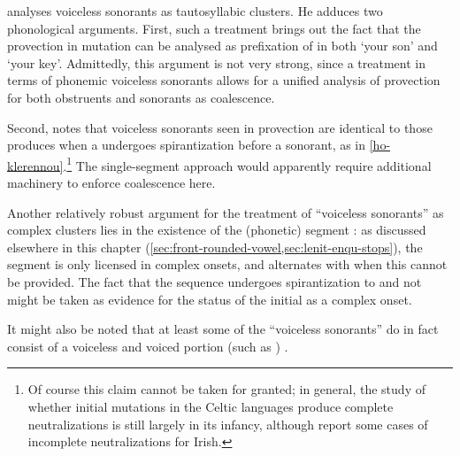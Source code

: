 \citet{humphreys,humphreys95:_phonol_bothoa_saint_nicol_pelem} analyses voiceless sonorants as tautosyllabic clusters. He adduces two phonological arguments. First, such a treatment brings out the fact that the provection in mutation can be analysed as prefixation of \ipa{[h]} in both  `your son' and \ipa{[o ˈhalve]} `your key'. Admittedly, this argument  is not very strong, since a treatment in terms of phonemic voiceless sonorants allows for a unified analysis of provection for both obstruents and sonorants as coalescence.

Second, \citet{humphreys95:_phonol_bothoa_saint_nicol_pelem} notes that voiceless sonorants seen in provection are identical to those produces when a \ipa{[k]} undergoes spirantization before a sonorant, as in \ref{ho-klerennou}.\footnote{Of course this claim cannot be taken for granted; in general, the study of whether initial mutations in the Celtic languages produce complete neutralizations is still largely in its infancy, although \citet{welby10:_irish} report some cases of incomplete neutralizations for Irish.} The single\hyp segment approach would apparently require additional machinery to enforce coalescence here.

Another relatively robust argument for the treatment of \enquote{voiceless sonorants} as complex clusters lies in the existence of the (phonetic) segment : as discussed elsewhere in this chapter (\cref{sec:front-rounded-vowel,sec:lenit-enqu-stops}), the segment \ipa{[ɥ]} is only licensed in complex onsets, and alternates with \ipa{[v]} when this cannot be provided. The fact that the sequence \ipa{[ʧɥ]} undergoes spirantization to \ipa{[ɥ̊]} and not \ipa{[f]} might be taken as evidence for the status of the initial \ipa{[hɥ]} as a complex onset.

It might also be noted that at least some of the \enquote{voiceless sonorants} do in fact consist of a voiceless and voiced portion (such as ) \citep[\cfm][]{maddieson84:_is}.

